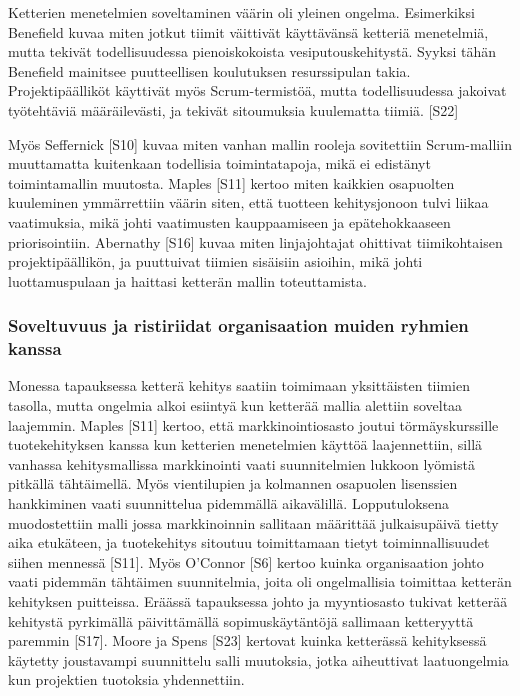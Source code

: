 Ketterien menetelmien soveltaminen väärin oli yleinen ongelma. Esimerkiksi
Benefield kuvaa miten jotkut tiimit väittivät käyttävänsä ketteriä menetelmiä,
mutta tekivät todellisuudessa pienoiskokoista vesiputouskehitystä. Syyksi tähän
Benefield mainitsee puutteellisen koulutuksen resurssipulan takia.
Projektipäälliköt käyttivät myös Scrum-termistöä, mutta todellisuudessa jakoivat
työtehtäviä määräilevästi, ja tekivät sitoumuksia kuulematta tiimiä. [S22]

Myös Seffernick [S10] kuvaa miten vanhan mallin rooleja sovitettiin
Scrum-malliin muuttamatta kuitenkaan todellisia toimintatapoja, mikä ei
edistänyt toimintamallin muutosta. Maples [S11] kertoo miten kaikkien osapuolten
kuuleminen ymmärrettiin väärin siten, että tuotteen kehitysjonoon tulvi liikaa
vaatimuksia, mikä johti vaatimusten kauppaamiseen ja epätehokkaaseen
priorisointiin. Abernathy [S16] kuvaa miten linjajohtajat ohittivat
tiimikohtaisen projektipäällikön, ja puuttuivat tiimien sisäisiin asioihin,
mikä johti luottamuspulaan ja haittasi ketterän mallin toteuttamista.

\subsubsection{Soveltuvuus ja ristiriidat organisaation muiden ryhmien kanssa}

Monessa tapauksessa ketterä kehitys saatiin toimimaan yksittäisten tiimien
tasolla, mutta ongelmia alkoi esiintyä kun ketterää mallia alettiin soveltaa
laajemmin. Maples [S11] kertoo, että markkinointiosasto joutui törmäyskurssille
tuotekehityksen kanssa kun ketterien menetelmien käyttöä laajennettiin, sillä
vanhassa kehitysmallissa markkinointi vaati suunnitelmien lukkoon lyömistä
pitkällä tähtäimellä. Myös vientilupien ja kolmannen osapuolen lisenssien
hankkiminen vaati suunnittelua pidemmällä aikavälillä. Lopputuloksena
muodostettiin malli jossa markkinoinnin sallitaan määrittää julkaisupäivä tietty
aika etukäteen, ja tuotekehitys sitoutuu toimittamaan tietyt toiminnallisuudet
siihen mennessä [S11]. Myös O'Connor [S6] kertoo kuinka organisaation johto
vaati pidemmän tähtäimen suunnitelmia, joita oli ongelmallisia toimittaa
ketterän kehityksen puitteissa. Eräässä tapauksessa johto ja myyntiosasto
tukivat ketterää kehitystä pyrkimällä päivittämällä sopimuskäytäntöjä sallimaan
ketteryyttä paremmin [S17]. Moore ja Spens [S23] kertovat kuinka ketterässä
kehityksessä käytetty joustavampi suunnittelu salli muutoksia, jotka aiheuttivat
laatuongelmia kun projektien tuotoksia yhdennettiin.

